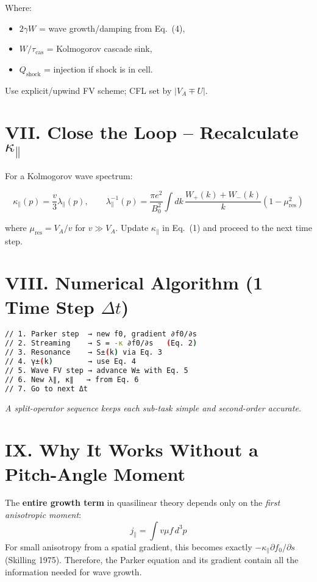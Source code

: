 Where:
\begin{itemize}
    \item $2\gamma W$ = wave growth/damping from Eq.~(4),
    \item $W/\tau_{\text{cas}}$ = Kolmogorov cascade sink,
    \item $Q_{\text{shock}}$ = injection if shock is in cell.
\end{itemize}

Use explicit/upwind FV scheme; CFL set by $|V_A \mp U|$.

\section*{VII. Close the Loop – Recalculate $\kappa_\parallel$}

For a Kolmogorov wave spectrum:

\begin{equation}
\kappa_\parallel(p) = \frac{v}{3} \lambda_\parallel(p), \qquad
\lambda_\parallel^{-1}(p) =
\frac{\pi e^2}{B_0^2}
\int dk\,
\frac{W_+(k) + W_-(k)}{k}
(1 - \mu_{\text{res}}^2)
\tag{6}
\end{equation}

where $\mu_{\text{res}} = V_A / v$ for $v \gg V_A$. Update $\kappa_\parallel$ in Eq.~(1) and proceed to the next time step.

\section*{VIII. Numerical Algorithm (1 Time Step $\Delta t$)}

\begin{lstlisting}[language=bash,basicstyle=\ttfamily\small]
// 1. Parker step  → new f0, gradient ∂f0/∂s
// 2. Streaming    → S = -κ ∂f0/∂s   (Eq. 2)
// 3. Resonance    → S±(k) via Eq. 3
// 4. γ±(k)        → use Eq. 4
// 5. Wave FV step → advance W± with Eq. 5
// 6. New λ∥, κ∥   → from Eq. 6
// 7. Go to next Δt
\end{lstlisting}

\textit{A split-operator sequence keeps each sub-task simple and second-order accurate.}

\section*{IX. Why It Works Without a Pitch-Angle Moment}

The \textbf{entire growth term} in quasilinear theory depends only on the \textit{first anisotropic moment}:
\[
j_\parallel = \int v\mu f \, d^3p
\]
For small anisotropy from a spatial gradient, this becomes exactly $-\kappa_\parallel \partial f_0/\partial s$ (Skilling 1975). Therefore, the Parker equation and its gradient contain all the information needed for wave growth.

